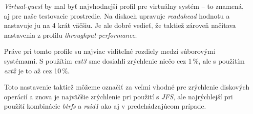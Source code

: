 \emph{Virtual-guest} by mal byť najvhodnejší profil pre virtuálny systém -- to
znamená, aj pre naše testovacie prostredie. Na diskoch upravuje
\emph{readahead} hodnotu a nastavuje ju na 4 krát väčšiu. Je ale dobré vedieť,
že taktiež zároveň načítava nastavenia z profilu \emph{throughput-performance}.

Práve pri tomto profile su najviac viditeľné rozdiely medzi súborovými
systémami. S použítím \emph{ext3} sme dosiahli zrýchlenie niečo cez 1\,\%, ale s
použitím \emph{ext2} je to až cez 10\,\%.

Toto nastavenie taktiež môžeme označiť za veľmi vhodné pre zrýchlenie diskových
operácií a znova je najväčšie zrýchlenie pri použití s \emph{JFS}, ale
najrýchlejší pri použítí kombinácie \emph{btrfs} a \emph{raid1} ako aj v
predchádzajúcom prípade. 
